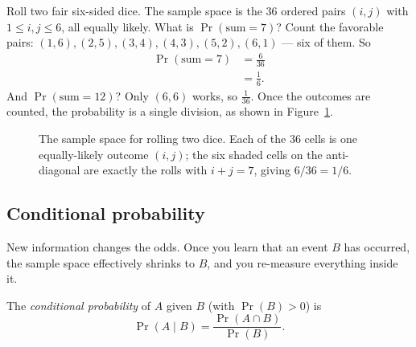 \begin{example}
\label{ch38:ex-dice}
Roll two fair six-sided dice. The sample space is the $36$ ordered pairs
$(i, j)$ with $1 \le i, j \le 6$, all equally likely. What is $\Pr(\text{sum} = 7)$?
Count the favorable pairs: $(1,6),(2,5),(3,4),(4,3),(5,2),(6,1)$ --- six of them. So
\begin{align*}
\Pr(\text{sum} = 7) &= \frac{6}{36} \\
&= \frac{1}{6}.
\end{align*}
And $\Pr(\text{sum} = 12)$? Only $(6,6)$ works, so $\tfrac{1}{36}$. Once the
outcomes are counted, the probability is a single division, as shown in Figure~\ref{fig:dice-grid}.

\begin{figure}[htbp]
\centering
{}
\caption{The sample space for rolling two dice. Each of the $36$ cells is one equally-likely outcome $(i,j)$; the six shaded cells on the anti-diagonal are exactly the rolls with $i + j = 7$, giving $6/36 = 1/6$.}
\label{fig:dice-grid}
\end{figure}
\end{example}

\subsection{Conditional probability}

New information changes the odds. Once you learn that an event $B$ has occurred, the
sample space effectively shrinks to $B$, and you re-measure everything inside it.

\begin{formalbox}
The \emph{conditional probability} of $A$ given $B$ (with $\Pr(B) > 0$) is
\[
\Pr(A \mid B) = \frac{\Pr(A \cap B)}{\Pr(B)}.
\]
\end{formalbox}

